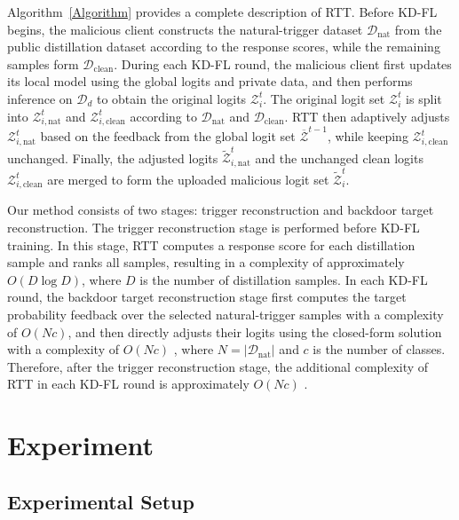 \documentclass[lettersize,journal]{IEEEtran}
\newif\ifhighlight
\newcommand{\hlthree}[1]{%
    \ifhighlight{\color{reviewer3}#1}\else#1\fi
}
\begin{document}
Algorithm~\ref{Algorithm} provides a complete description of RTT.
Before KD-FL begins, the malicious client constructs the natural-trigger dataset $\mathcal{D}_\mathrm{nat}$ from the public distillation dataset according to the response scores, while the remaining samples form $\mathcal{D}_\mathrm{clean}$.
During each KD-FL round, the malicious client first updates its local model using the global logits and private data, and then performs inference on $\mathcal{D}_d$ to obtain the original logits $\mathcal{Z}_i^t$. 
The original logit set \(\mathcal{Z}_i^t\) is split into \(\mathcal{Z}_{i,\mathrm{nat}}^{t}\) and \(\mathcal{Z}_{i,\mathrm{clean}}^{t}\) according to \(\mathcal{D}_\mathrm{nat}\) and \(\mathcal{D}_\mathrm{clean}\).
RTT then adaptively adjusts \(\mathcal{Z}_{i,\mathrm{nat}}^{t}\) based on the feedback from the global logit set \(\overline{\mathcal{Z}}^{t-1}\), while keeping \(\mathcal{Z}_{i,\mathrm{clean}}^{t}\) unchanged.
Finally, the adjusted logits \(\widetilde{\mathcal{Z}}_{i,\mathrm{nat}}^{t}\) and the unchanged clean logits \(\mathcal{Z}_{i,\mathrm{clean}}^{t}\) are merged to form the uploaded malicious logit set \(\widetilde{\mathcal{Z}}_i^t\).

Our method consists of two stages: trigger reconstruction and backdoor target reconstruction.
The trigger reconstruction stage is performed before KD-FL training.
In this stage, RTT computes a response score for each distillation sample and ranks all samples, resulting in a complexity of approximately $O(D\log D)$, where $D$ is the number of distillation samples.
In each KD-FL round, the backdoor target reconstruction stage first computes the target probability feedback over the selected natural-trigger samples with a complexity of $O(Nc)$, and then \hlthree{directly adjusts their logits using the closed-form solution with a complexity of $O(Nc)$}, where $N=|\mathcal{D}_\mathrm{nat}|$ and $c$ is the number of classes.
Therefore, after the trigger reconstruction stage, the additional complexity of RTT in each KD-FL round is approximately \hlthree{$O(Nc)$}.



\section{Experiment}

\subsection{Experimental Setup}
\end{document}
